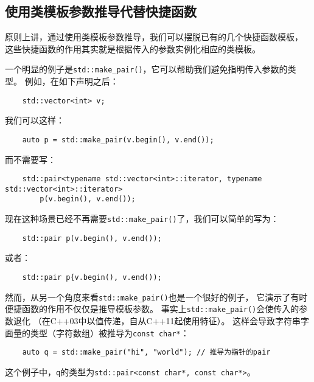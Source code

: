 \subsection{使用类模板参数推导代替快捷函数}\label{ch9.1.4}
原则上讲，通过使用类模板参数推导，我们可以摆脱已有的几个快捷函数模板，
这些快捷函数的作用其实就是根据传入的参数实例化相应的类模板。

一个明显的例子是\texttt{std::make\_pair()}，它可以帮助我们避免指明传入参数的类型。
例如，在如下声明之后：
\begin{lstlisting}
    std::vector<int> v;
\end{lstlisting}
我们可以这样：
\begin{lstlisting}
    auto p = std::make_pair(v.begin(), v.end());
\end{lstlisting}
而不需要写：
\begin{lstlisting}
    std::pair<typename std::vector<int>::iterator, typename std::vector<int>::iterator>
        p(v.begin(), v.end());
\end{lstlisting}
现在这种场景已经不再需要\texttt{std::make\_pair()}了，我们可以简单的写为：
\begin{lstlisting}
    std::pair p(v.begin(), v.end());
\end{lstlisting}
或者：
\begin{lstlisting}
    std::pair p{v.begin(), v.end());
\end{lstlisting}

然而，从另一个角度来看\texttt{std::make\_pair()}也是一个很好的例子，
它演示了有时便捷函数的作用不仅仅是推导模板参数。
事实上\texttt{std::make\_pair()}会使传入的参数退化
（在C++03中以值传递，自从C++11起使用特征）。
这样会导致字符串字面量的类型（字符数组）被推导为\texttt{const char*}：
\begin{lstlisting}
    auto q = std::make_pair("hi", "world"); // 推导为指针的pair
\end{lstlisting}
这个例子中，\texttt{q}的类型为\texttt{std::pair<const char*, const char*>}。

